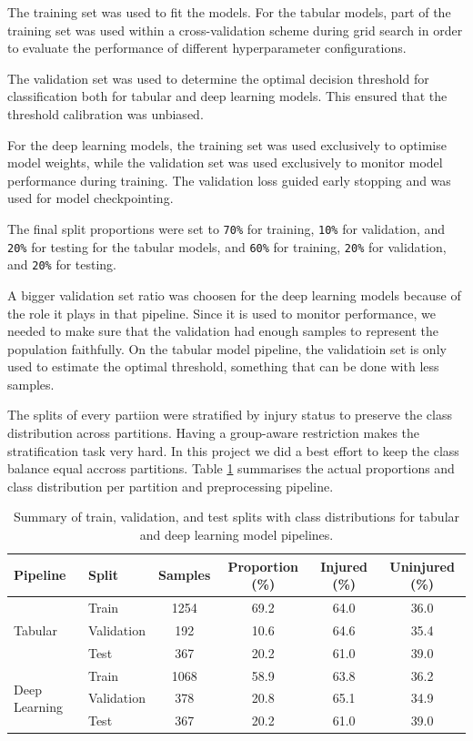 The training set was used to fit the models. For the tabular models, part of the training set was used  within a cross-validation scheme during grid search in order to evaluate the performance of different hyperparameter configurations.

The validation set was used to determine the optimal decision threshold for classification both for tabular and deep learning models. This ensured that the threshold calibration was unbiased.

For the deep learning models, the training set was used exclusively to optimise model weights, while the validation set was used exclusively to monitor model performance during training. The validation loss guided early stopping and was used for model checkpointing.

The final split proportions were set to \texttt{70\%} for training, \texttt{10\%} for validation, and \texttt{20\%} for testing for the tabular models, and \texttt{60\%} for training, \texttt{20\%} for validation, and \texttt{20\%} for testing.

A bigger validation set ratio was choosen for the deep learning models because of the role it plays in that pipeline. Since it is used to monitor performance, we needed to make sure that the validation had enough samples to represent the population faithfully. On the tabular model pipeline, the validatioin set is only used to estimate the optimal threshold, something that can be done with less samples.

The splits of every partiion were stratified by injury status to preserve the class distribution across partitions. Having a group-aware restriction makes the stratification task very hard. In this project we did a best effort to keep the class balance equal accross partitions. Table \ref{tab:met-data-splits} summarises the actual proportions and class distribution per partition and preprocessing pipeline.


\begin{table}[htbp]
    \centering
    \caption[Train-Test-Validation Split and Class Distribution]{Summary of train, validation, and test splits with class distributions for tabular and deep learning model pipelines.}
    \label{tab:met-data-splits}
    \begin{tabular}{llcccc}
    \hline
    \textbf{Pipeline} & \textbf{Split} & \textbf{Samples} & \textbf{Proportion (\%)} & \textbf{Injured (\%)} & \textbf{Uninjured (\%)} \\
    \hline
    \multirow{3}{*}{Tabular}
      & Train & 1254 & 69.2 & 64.0 & 36.0 \\
      & Validation & 192 & 10.6 & 64.6 & 35.4 \\
      & Test & 367 & 20.2 & 61.0 & 39.0 \\
    \hline
    \multirow{3}{*}{Deep Learning}
      & Train & 1068 & 58.9 & 63.8 & 36.2 \\
      & Validation & 378 & 20.8 & 65.1 & 34.9 \\
      & Test & 367 & 20.2 & 61.0 & 39.0 \\
    \hline
    \end{tabular}
\end{table}


